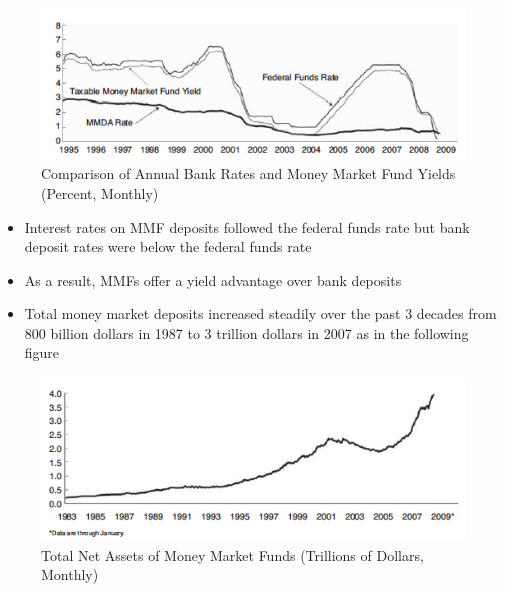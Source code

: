 \documentclass[11pt]{beamer}
\begin{document}
\begin{frame}
\begin{figure}
\includegraphics[width=\textwidth]{10_1.png}
\caption{Comparison of Annual Bank Rates and Money Market Fund Yields (Percent, Monthly)}
\end{figure}
\end{frame}

\begin{frame}
\begin{itemize}
\item Interest rates on MMF deposits followed the federal funds rate but bank deposit rates were below the federal funds rate
\item As a result, MMFs offer a yield advantage over bank deposits
\item Total money market deposits increased steadily over the past 3 decades from $800$ billion dollars in 1987 to $3$ trillion dollars in 2007 as in the following figure
\end{itemize}
\end{frame}

\begin{frame}
\begin{figure}
\includegraphics[width=\textwidth]{10_2.png}
\caption{Total Net Assets of Money Market Funds (Trillions of Dollars, Monthly)}
\end{figure}
\end{frame}
\end{document}
